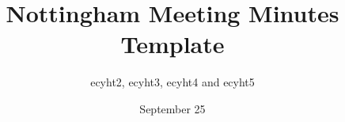 \documentclass[12pt]{article}
\author{ecyht2, ecyht3, ecyht4 and ecyht5}
\title{Nottingham Meeting Minutes Template}
\date{September 25}
\begin{document}
    \maketitle

    \begin{progress}
        
    \end{progress}

    \begin{planned}
        
    \end{planned}

    \begin{remarks}
                
    \end{remarks}

    \printsignatures
\end{document}
